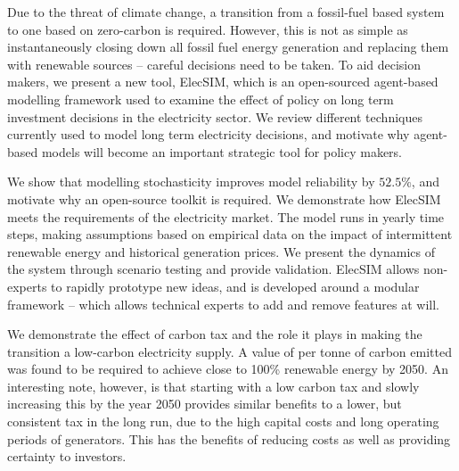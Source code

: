 Due to the threat of climate change, a transition from a fossil-fuel based system to one based on zero-carbon is required. However, this is not as simple as instantaneously closing down all fossil fuel energy generation and replacing them with renewable sources -- careful decisions need to be taken. To aid decision makers, we present a new tool, ElecSIM, which is an open-sourced agent-based modelling framework used to examine the effect of policy on long term investment decisions in the electricity sector. We review different techniques currently used to model long term electricity decisions, and motivate why agent-based models will become an important strategic tool for policy makers.

We show that modelling stochasticity improves model reliability by $52.5\%$, and motivate why an open-source toolkit is required. We demonstrate how ElecSIM meets the requirements of the electricity market. The model runs in yearly time steps, making assumptions based on empirical data on the impact of intermittent renewable energy and historical generation prices. We present the dynamics of the system through scenario testing and provide validation. ElecSIM allows non-experts to rapidly prototype new ideas, and is developed around a modular framework -- which allows technical experts to add and remove features at will. 


We demonstrate the effect of carbon tax and the role it plays in making the transition a low-carbon electricity supply. A value of  per tonne of carbon emitted was found to be required to achieve close to 100\% renewable energy by 2050. An interesting note, however, is that starting with a low carbon tax and slowly increasing this by the year 2050 provides similar benefits to a lower, but consistent tax in the long run, due to the high capital costs and long operating periods of generators. This has the benefits of reducing costs as well as providing certainty to investors.
